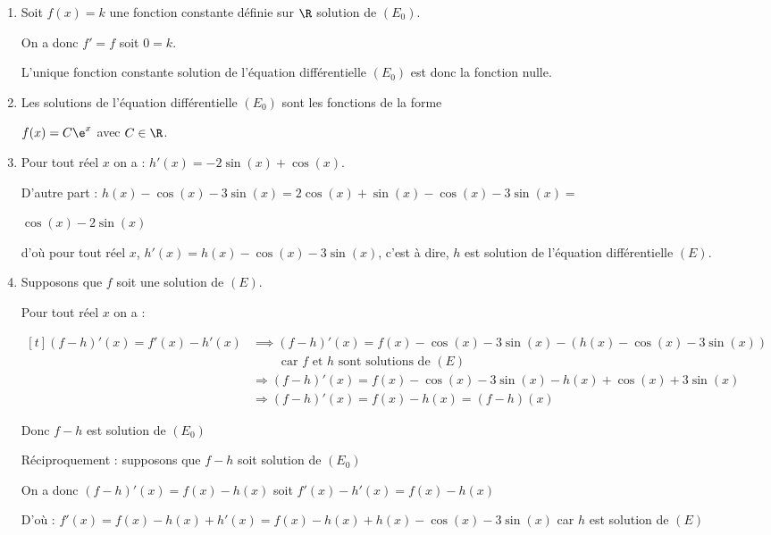 \medskip

		\begin{enumerate}
			\item Soit $f(x)=k$ une fonction constante définie sur $\R$ solution de $\left( E_0\right)$.

On a donc $f'=f$ soit $0=k$.

L'unique fonction constante solution de l'équation différentielle $\left(E_{0}\right)$ est donc la fonction nulle.

			\item Les solutions de l'équation différentielle $\left(E_{0}\right)$ sont les fonctions de la forme 

$f(x)=C\e^x$ avec $C \in \R$.



		\item


Pour tout réel $x$ on a : \quad $h'(x) =-2\sin(x) +\cos(x)$.

D'autre part : \quad $h(x)-\cos (x)-3 \sin (x)= 2 \cos (x)+\sin (x)- \cos (x)-3 \sin (x) =$

$ \cos(x)-2\sin(x)$

d'où pour tout réel $x$,  \quad$h'(x) = h(x) -\cos (x)-3 \sin (x)$,  c'est à dire, $h$ est solution de l'équation différentielle $(E)$.

			\item Supposons que  $f$ soit une solution de $(E)$.

Pour tout réel $x$ on a :

$\begin{aligned}[t] (f-h)'(x)=f'(x)-h'(x) &\implies (f-h)'(x)= f(x) -\cos (x)-3 \sin (x) - \left( h(x) -\cos (x)-3 \sin (x) \right)\\
&\qquad \text{  car $f$ et $h$ sont solutions de $(E)$}\\
&  \Longrightarrow (f-h)'(x)= f(x) -\cos (x)-3 \sin (x) - h(x) +\cos (x)+3 \sin (x) \\
&  \Longrightarrow (f-h)'(x)= f(x)  - h(x)   = (f-h)(x)\end{aligned}$

Donc $f-h$ est solution de $\left(E_{0}\right)$
\smallskip

Réciproquement : supposons que $f-h$ soit solution de $\left(E_{0}\right)$

On a donc $(f-h)'(x) = f(x)  - h(x)  $ soit $f'(x) -h'(x)= f(x) -h(x)$

D'où : $f'(x) = f(x) -h(x) +h'(x) = f(x) -h(x) + h(x) -\cos (x)-3 \sin (x)$ car $h$ est solution de $(E)$


\end{enumerate}
